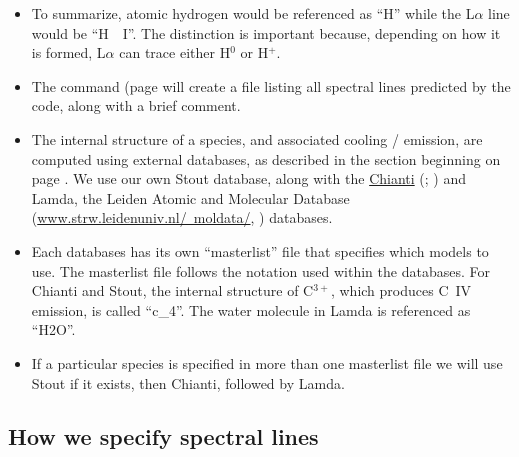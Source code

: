 \begin{itemize}
\item
To summarize, atomic hydrogen would be referenced as ``H'' while the L$\alpha$
line would be ``H~~I''.  The distinction is important because,
depending on how it is formed, L$\alpha$ can trace either
H$^0$ or H$^+$.

\item  The  command
(page \pageref{sec:SaveLineLabels} will create a file
listing all spectral lines predicted by the code, along with a brief comment.
  
 \item
 The internal structure of a species, and associated cooling / emission, are computed
 using external databases, as described in the section beginning on
 page \pageref{sec:ControllingAtomicModels}.
 We use our own Stout database, along with the 
\href{http://www.chiantidatabase.org/}{Chianti}  
(\cite{Dere.K97CHIANTI---an-atomic-database-for-emission}; \cite{Landi2012})
and Lamda, the Leiden Atomic and Molecular
Database (\href{http://www.strw.leidenuniv.nl/~moldata/}{www.strw.leidenuniv.nl/~moldata/}, 
\citet{Schoier.F05An-atomic-and-molecular-database-for-analysis}) databases.

\item
Each databases has its own ``masterlist'' file that
specifies which models to use.
The masterlist file follows the notation used within the databases.
For Chianti and Stout, the internal structure of C$^{3+}$, which produces C~IV emission,
is called ``c\_4''.
The water molecule in Lamda is referenced as ``H2O''.

\item
If a particular species is specified in more than one masterlist file we will
use Stout if it exists, then Chianti, followed by Lamda.  

\end{itemize}

\subsection{How we specify spectral lines}
\label{sec:SpecifySpectralLines}

